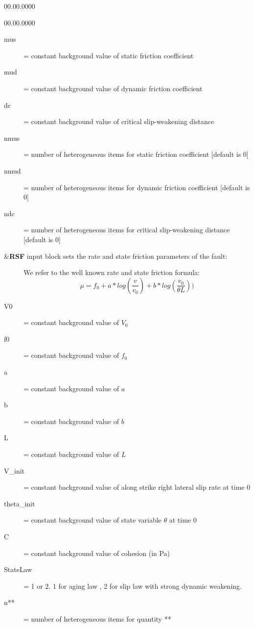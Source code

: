 \begin{lyxlist}{00.00.0000}
\begin{lyxlist}{00.00.0000}
\begin{description}
\item [{mus}] = constant background value of static friction coefficient
\item [{mud}] = constant background value of dynamic friction coefficient
\item [{dc}] = constant background value of critical slip-weakening distance
\item [{nmus}] = number of heterogeneous items for static friction coefficient
{[}default is 0{]}
\item [{nmud}] = number of heterogeneous items for dynamic friction coefficient
{[}default is 0{]}
\item [{ndc}] = number of heterogeneous items for critical slip-weakening
distance {[}default is 0{]}\\

\end{description}

\item [{\&\textbf{RSF}}] input block sets the rate and state friction parameters
of the fault:

\begin{description}
  \item []
    We refer to the well known rate and state friction formula:
    $$\mu = f_0 + a* log(\frac{v}{v_0}) + b* log(\frac{v_0}{\theta L}))  $$
\item [{V0}] = constant background value of $V_0$
\item [{f0}] = constant background value of $f_0$
\item [{a}] = constant background value of $a$
\item [{b}] = constant background value of $b$
\item [{L}] = constant background value of $L$
\item [{V\_init}] = constant background value of along strike right lateral slip rate at time 0
\item [{theta\_init}] = constant background value of state variable $\theta$ at time 0
\item [{C}] = constant background value of cohesion (in Pa)
\item [{StateLaw}] = 1 or 2. 1 for aging law , 2 for slip law with strong dynamic weakening.
\item [{n**}] = number of heterogeneous items for quantity **
\end{description}




\end{lyxlist}
\end{lyxlist}
